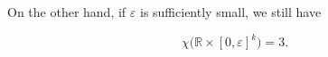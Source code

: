 \documentclass[12pt,a4paper]{article}
\newtheorem{conjecture}{Conjecture}
\newtheorem{corollary}{Corollary}
\begin{document}
\medskip

On the other hand, if $\varepsilon$ is sufficiently small, we still have

\[
 \chi\bigl(\mathbb{R}\times[0,\varepsilon]^k\bigr) = 3.
\]








\end{document}
